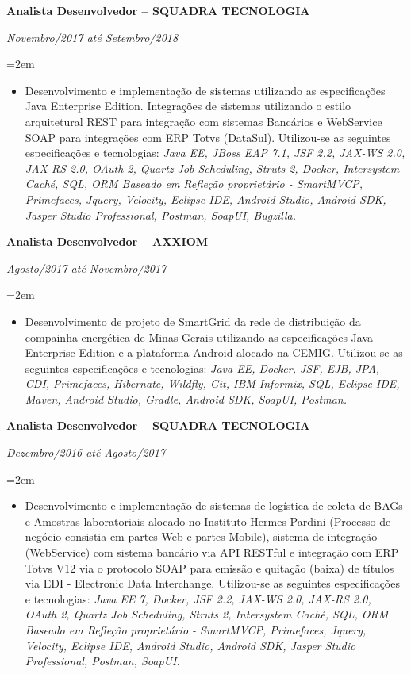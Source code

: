 \documentclass[paper=a4,fontsize=11pt]{scrartcl} %
\newcommand{\EducationEntry}[4]{
		\noindent \textbf{#1} \hfill      %
		\colorbox{White}{%
			\parbox{5cm}{%
			\hfill\color{Black}#2}} \par  %
		\noindent \textit{#3} \par        %
		\noindent\hangindent=2em\hangafter=0 \small #4 %
		\normalsize \par}
\begin{document}
\EducationEntry{Analista Desenvolvedor – SQUADRA TECNOLOGIA}{}{Novembro/2017 até Setembro/2018}{
	\begin{itemize}
		\item{Desenvolvimento e implementação de sistemas utilizando as especificações Java
		Enterprise Edition. Integrações de sistemas utilizando o estilo arquitetural REST para
		integração com sistemas Bancários e WebService SOAP para integrações com ERP Totvs
		(DataSul). Utilizou-se as seguintes especificações e tecnologias: \newline \newline
		      \textit{Java EE, JBoss EAP 7.1, JSF 2.2, JAX-WS 2.0, JAX-RS 2.0, OAuth 2, Quartz Job
			  Scheduling, Struts 2, Docker, Intersystem Caché, SQL, ORM Baseado em Refleção proprietário -
			  SmartMVCP, Primefaces, Jquery, Velocity, Eclipse IDE, Android Studio, Android SDK,
			  Jasper Studio Professional, Postman, SoapUI, Bugzilla.}}

	\end{itemize}
}

\EducationEntry{Analista Desenvolvedor – AXXIOM}{}{Agosto/2017 até Novembro/2017}{
	\begin{itemize}
		\item{Desenvolvimento de projeto de SmartGrid da rede de distribuição da compainha energética
		de Minas Gerais utilizando as especificações Java Enterprise Edition e a plataforma
		Android alocado na CEMIG. Utilizou-se as seguintes especificações e tecnologias: \newline \newline
		      \textit{Java EE, Docker, JSF, EJB, JPA, CDI, Primefaces, Hibernate, Wildfly, Git, IBM Informix, SQL,
			  Eclipse IDE, Maven, Android Studio, Gradle, Android SDK, SoapUI, Postman.}}

	\end{itemize}
}

\EducationEntry{Analista Desenvolvedor – SQUADRA TECNOLOGIA}{}{Dezembro/2016 até Agosto/2017}{
	\begin{itemize}
		\item{Desenvolvimento e implementação de sistemas de logística de coleta de BAGs e Amostras
		laboratoriais alocado no Instituto Hermes Pardini (Processo de negócio consistia em partes
		Web e partes Mobile), sistema de integração (WebService) com sistema bancário via API
		RESTful e integração com ERP Totvs V12 via o protocolo SOAP para emissão e quitação
		(baixa) de títulos via EDI - Electronic Data Interchange. Utilizou-se as seguintes
		especificações e tecnologias: \newline \newline
		      \textit{Java EE 7, Docker, JSF 2.2, JAX-WS 2.0, JAX-RS 2.0, OAuth 2, Quartz Job Scheduling, Struts 2,
			  Intersystem Caché, SQL, ORM Baseado em Refleção proprietário - SmartMVCP,
			  Primefaces, Jquery, Velocity, Eclipse IDE, Android Studio, Android SDK, Jasper Studio
			  Professional, Postman, SoapUI.}}

	\end{itemize}
}
\end{document}

